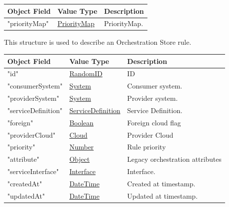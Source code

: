 \documentclass[a4paper]{arrowhead}
\newcommand{\pref}[1]{{\textcolor{ArrowheadGrey}{\hyperref[sec:model:primitives:#1]{#1}}}}
\begin{document}
\begin{table}[ht!]
\begin{tabularx}{\textwidth}{| p{5cm} | p{5cm} | X |} \hline
\rowcolor{gray!33} Object Field & Value Type      & Description \\ \hline
"priorityMap"                   & \pref{PriorityMap}     & PriorityMap. \\ \hline

\end{tabularx}
\end{table}



This structure is used to describe an Orchestration Store rule.

\begin{table}[ht!]
\begin{tabularx}{\textwidth}{| p{5cm} | p{5cm} | X |} \hline
\rowcolor{gray!33} Object Field & Value Type      & Description \\ \hline
"id"                 & \pref{RandomID}                     & ID \\ \hline
"consumerSystem"     & \pref{System}                       & Consumer system. \\ \hline
"providerSystem"     & \pref{System}                       & Provider system. \\ \hline
"serviceDefinition"  & \pref{ServiceDefinition}            & Service Definition. \\ \hline
"foreign"            & \pref{Boolean}                      & Foreign cloud flag \\ \hline
"providerCloud"      & \pref{Cloud}                        & Provider Cloud \\ \hline
"priority"           & \pref{Number}                       & Rule priority \\ \hline
"attribute"          & \pref{Object}                       & Legacy orchestration attributes \\ \hline
"serviceInterface"   & \pref{Interface}                    & Interface. \\ \hline
"createdAt"          & \pref{DateTime}                     & Created at timestamp. \\ \hline
"updatedAt"          & \pref{DateTime}                     & Updated at timestamp. \\ \hline

\end{tabularx}
\end{table}
\end{document}
